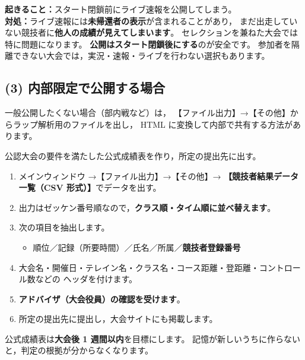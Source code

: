 \begin{Fail}
\textbf{起きること：}スタート閉鎖前にライブ速報を公開してしまう。\\
\textbf{対処：}ライブ速報には\textbf{未帰還者の表示}が含まれることがあり，
まだ出走していない競技者に\textbf{他人の成績が見えてしまいます}。
セレクションを兼ねた大会では特に問題になります。
\textbf{公開はスタート閉鎖後にする}のが安全です。
参加者を隔離できない大会では，実況・速報・ライブを行わない選択もあります。
\end{Fail}

\subsection*{(3) 内部限定で公開する場合}

一般公開したくない場合（部内戦など）は，
【ファイル出力】→【その他】からラップ解析用のファイルを出し，
HTML に変換して内部で共有する方法があります。\ver


\begin{Goal}
公認大会の要件を満たした公式成績表を作り，所定の提出先に出す。
\end{Goal}

\begin{enumerate}
\item メインウィンドウ →【ファイル出力】→【その他】→
      \textbf{【競技者結果データ一覧（CSV 形式）】}でデータを出す。\ver
\item 出力はゼッケン番号順なので，\textbf{クラス順・タイム順に並べ替えます}。
\item 次の項目を抽出します。
      \begin{itemize}
      \item 順位／記録（所要時間）／氏名／所属／\textbf{競技者登録番号}
      \end{itemize}
\item 大会名・開催日・テレイン名・クラス名・コース距離・登距離・コントロール数などの
      ヘッダを付けます。
\item \textbf{アドバイザ（大会役員）の確認を受けます}。
\item 所定の提出先に提出し，大会サイトにも掲載します。
\end{enumerate}

\begin{Note}[期限]
公式成績表は\textbf{大会後 1 週間以内}を目標にします。
記憶が新しいうちに作らないと，判定の根拠が分からなくなります。
\end{Note}

